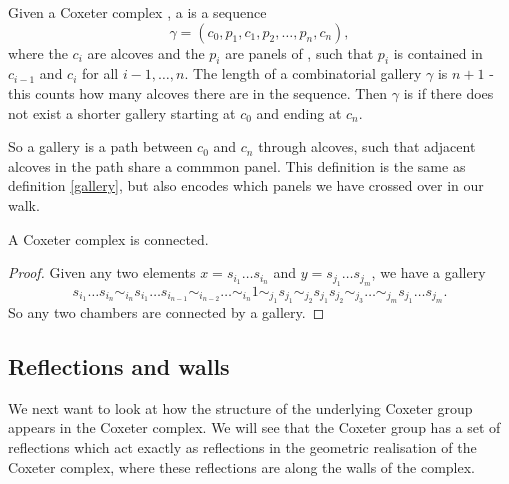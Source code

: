 \documentclass[11pt]{article}
\begin{document}
\begin{definition}\label{comb.gallery}
    Given a Coxeter complex \sg, a  is a sequence
    \[\gamma = (c_0,p_1,c_1,p_2,\hdots  ,p_n,c_n),\]
    where the $c_i$ are alcoves and the $p_i$ are panels of \sg, such that $p_i$ is contained in $c_{i-1}$ and $c_{i}$ for all $i-1,\hdots ,n$. The length of a combinatorial gallery $\gamma$ is $n+1$ - this counts how many alcoves there are in the sequence. Then $\gamma$ is  if there does not exist a shorter gallery starting at $c_0$ and ending at $c_n$. 
\end{definition}

So a gallery is a path between $c_0$ and $c_n$ through alcoves, such that adjacent alcoves in the path share a commmon panel. This definition is the same as definition \ref{gallery}, but also encodes which panels we have crossed over in our walk. 

\begin{lemma}
    A Coxeter complex is connected.
\end{lemma}

\begin{proof}
    Given any two elements $x=s_{i_1}\hdots s_{i_n}$ and $y=s_{j_1}\hdots s_{j_m}$, we have a gallery
    \[s_{i_1}\hdots s_{i_n}\sim_{i_n}s_{i_1}\hdots s_{i_{n-1}}\sim_{i_{n-2}}\hdots \sim_{i_n} 1 \sim_{j_1}s_{j_1}\sim_{j_2}s_{j_1}s_{j_2}\sim_{j_3}\hdots\sim_{j_m}s_{j_1}\hdots s_{j_m}.\]
    So any two chambers are connected by a gallery.
\end{proof}




\subsection{Reflections and walls}
We next want to look at how the structure of the underlying Coxeter group appears in the Coxeter complex. We will see that the Coxeter group has a set of reflections which act exactly as reflections in the geometric realisation of the Coxeter complex, where these reflections are along the walls of the complex. 
\end{document}
